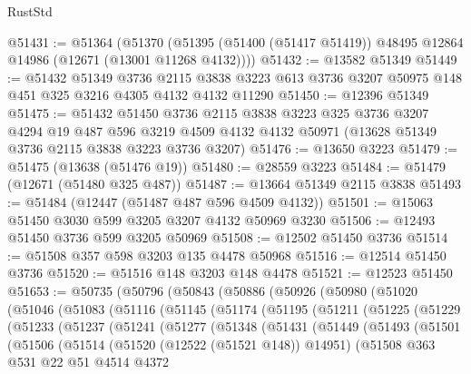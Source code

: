 \begin{lexlean}{RustStd}
\begin{coremodule}
@51431 := @51364
    (@51370 (@51395 (@51400 (@51417 @51419)) @48495 @12864 @14986 (@12671 (@13001 @11268 @4132))))
@51432 := @13582 @51349
@51449 := @51432
    @51349
    @3736
    @2115
    @3838
    @3223
    @613
    @3736
    @3207
    @50975
    @148
    @451
    @325
    @3216
    @4305
    @4132
    @4132
    @11290
@51450 := @12396 @51349
@51475 := @51432
    @51450
    @3736
    @2115
    @3838
    @3223
    @325
    @3736
    @3207
    @4294
    @19
    @487
    @596
    @3219
    @4509
    @4132
    @4132
    @50971
    (@13628 @51349 @3736 @2115 @3838 @3223 @3736 @3207)
@51476 := @13650 @3223
@51479 := @51475 (@13638 (@51476 @19))
@51480 := @28559 @3223
@51484 := @51479 (@12671 (@51480 @325 @487))
@51487 := @13664 @51349 @2115 @3838
@51493 := @51484 (@12447 (@51487 @487 @596 @4509 @4132))
@51501 := @15063 @51450 @3030 @599 @3205 @3207 @4132 @50969 @3230
@51506 := @12493 @51450 @3736 @599 @3205 @50969
@51508 := @12502 @51450 @3736
@51514 := @51508 @357 @598 @3203 @135 @4478 @50968
@51516 := @12514 @51450 @3736
@51520 := @51516 @148 @3203 @148 @4478
@51521 := @12523 @51450
@51653 := @50735
    (@50796
      (@50843
        (@50886
          (@50926
            (@50980
              (@51020
                (@51046
                  (@51083
                    (@51116
                      (@51145
                        (@51174
                          (@51195
                            (@51211
                              (@51225
                                (@51229
                                  (@51233
                                    (@51237
                                      (@51241
                                        (@51277
                                          (@51348
                                            (@51431
                                              (@51449
                                                (@51493
                                                  (@51501
                                                    (@51506
                                                      (@51514
                                                        (@51520 (@12522 (@51521 @148)) @14951)
                                                        (@51508
                                                          @363
                                                          @531
                                                          @22
                                                          @51
                                                          @4514
                                                          @4372

\end{coremodule}
\end{lexlean}
